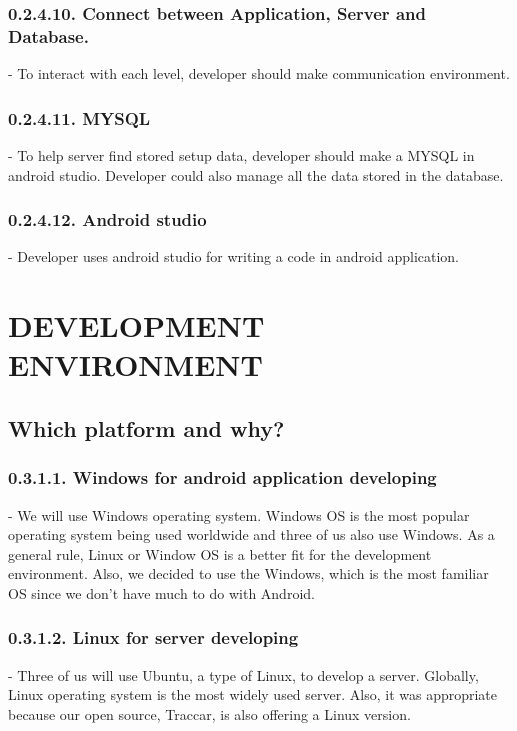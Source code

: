 \documentclass[10pt,a4paper,twocolumn]{report}
\begin{document}
		\subsubsection{0.2.4.10. Connect between Application, Server and Database.}
		- To interact with each level, developer should make communication environment.\\

		\subsubsection{0.2.4.11. MYSQL}
		- To help server find stored setup data, developer should make a MYSQL in android studio. Developer could also manage all the data stored in the database.\\
		
		\subsubsection{0.2.4.12. Android studio}
		- Developer uses android studio for writing a code in android application.\\


\section{DEVELOPMENT ENVIRONMENT}
	\subsection{Which platform and why?}
		\subsubsection{0.3.1.1. Windows for android application developing}
		- We will use Windows operating system. Windows OS is the most popular operating system being used worldwide and three of us also use Windows. As a general rule, Linux or Window OS is a better fit for the development environment. Also, we decided to use the Windows, which is the most familiar OS since we don't have much to do with Android.\\
		
		\subsubsection{0.3.1.2. Linux for server developing}
		- Three of us will use Ubuntu, a type of Linux, to develop a server. Globally, Linux operating system is the most widely used server. Also, it was appropriate because our open source, Traccar, is also offering a Linux version.\\
		
\end{document}
